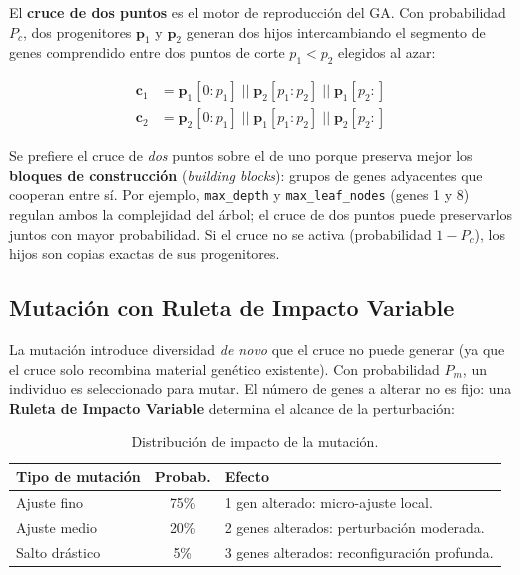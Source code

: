 \documentclass[12pt, a4paper]{article}
\begin{document}
El \textbf{cruce de dos puntos} es el motor de reproducción del GA. Con probabilidad $P_c$,
dos progenitores $\mathbf{p}_1$ y $\mathbf{p}_2$ generan dos hijos intercambiando
el segmento de genes comprendido entre dos puntos de corte $p_1 < p_2$ elegidos al azar:

\begin{align}
  \mathbf{c}_1 &= \mathbf{p}_1[0{:}p_1] \;||\; \mathbf{p}_2[p_1{:}p_2] \;||\; \mathbf{p}_1[p_2{:}] \\
  \mathbf{c}_2 &= \mathbf{p}_2[0{:}p_1] \;||\; \mathbf{p}_1[p_1{:}p_2] \;||\; \mathbf{p}_2[p_2{:}]
\end{align}

Se prefiere el cruce de \emph{dos} puntos sobre el de uno porque preserva mejor los
\textbf{bloques de construcción} (\textit{building blocks}): grupos de genes adyacentes
que cooperan entre sí. Por ejemplo, \texttt{max\_depth} y \texttt{max\_leaf\_nodes}
(genes 1 y 8) regulan ambos la complejidad del árbol; el cruce de dos puntos puede
preservarlos juntos con mayor probabilidad. Si el cruce no se activa (probabilidad
$1-P_c$), los hijos son copias exactas de sus progenitores.

\subsection{Mutación con Ruleta de Impacto Variable}

La mutación introduce diversidad \textit{de novo} que el cruce no puede generar (ya que
el cruce solo recombina material genético existente). Con probabilidad $P_m$, un
individuo es seleccionado para mutar. El número de genes a alterar no es fijo: una
\textbf{Ruleta de Impacto Variable} determina el alcance de la perturbación:

\renewcommand{\arraystretch}{1.2}
\begin{table}[H]
  \centering
  \caption{Distribución de impacto de la mutación.}
  \begin{tabular}{lcl}
    \toprule
    \textbf{Tipo de mutación} & \textbf{Probab.} & \textbf{Efecto} \\
    \midrule
    Ajuste fino    & 75\% & 1 gen alterado: micro-ajuste local. \\
    Ajuste medio   & 20\% & 2 genes alterados: perturbación moderada. \\
    Salto drástico &  5\% & 3 genes alterados: reconfiguración profunda. \\
    \bottomrule
  \end{tabular}
\end{table}
\renewcommand{\arraystretch}{1}
\end{document}
